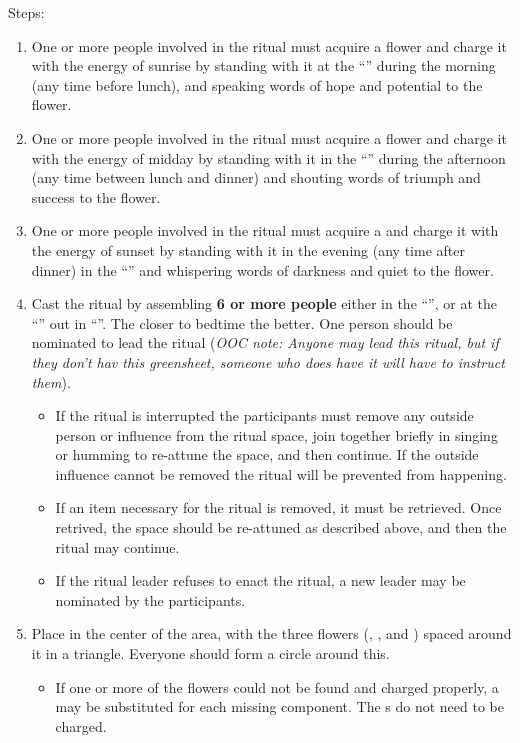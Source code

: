 \documentclass[green]{GL2020}
\begin{document}
Steps:
\begin{enumerate}
  \item One or more people involved in the ritual must acquire a \iMorningGlory{} flower and charge it with the energy of sunrise by standing with it at the ``\pGarden{}'' during the morning (any time before lunch), and speaking words of hope and potential to the flower. 
  \item One or more people involved in the ritual must acquire a \iLily{} flower and charge it with the energy of midday by standing with it in the ``\pTrainingField{}'' during the afternoon (any time between lunch and dinner) and shouting words of triumph and success to the flower.
  \item One or more people involved in the ritual must acquire a \iMoonflower{} and charge it with the energy of sunset by standing with it in the evening (any time after dinner)  in the ``\pGraveyard{}'' and whispering words of darkness and quiet to the flower.
  \item Cast the ritual by assembling \textbf{6 or more people} either in the ``\pStudentLoungeBunker{}'', or at the ``\sMemorialToFallenStudents{}'' out in ``\pGraveyard{}''. The closer to bedtime the better. One person should be nominated to lead the ritual (\emph{OOC note: Anyone may lead this ritual, but if they don't hav this greensheet, someone who does have it will have to instruct them}). 
  \begin{itemize}
  \item  If the ritual is interrupted the participants must remove any outside person or influence from the ritual space, join together briefly in singing or humming to re-attune the space, and then continue. If the outside influence cannot be removed the ritual will be prevented from happening.
  \item If an item necessary for the ritual is removed, it must be retrieved. Once retrived, the space should be re-attuned as described above, and then the ritual may continue.
  \item If the ritual leader refuses to enact the ritual, a new leader may be nominated by the participants.
  \end{itemize}
  \item Place \iMirror{} in the center of the area, with the three flowers (\iMorningGlory{}, \iLily{}, and \iMoonflower{}) spaced around it in a triangle. Everyone should form a circle around this.
  \begin{itemize}
  \item If one or more of the flowers could not be found and charged properly, a \iStoneFlower{} may be substituted for each missing component. The \iStoneFlower{}s do not need to be charged.

\end{itemize}
\end{enumerate}
\end{document}
